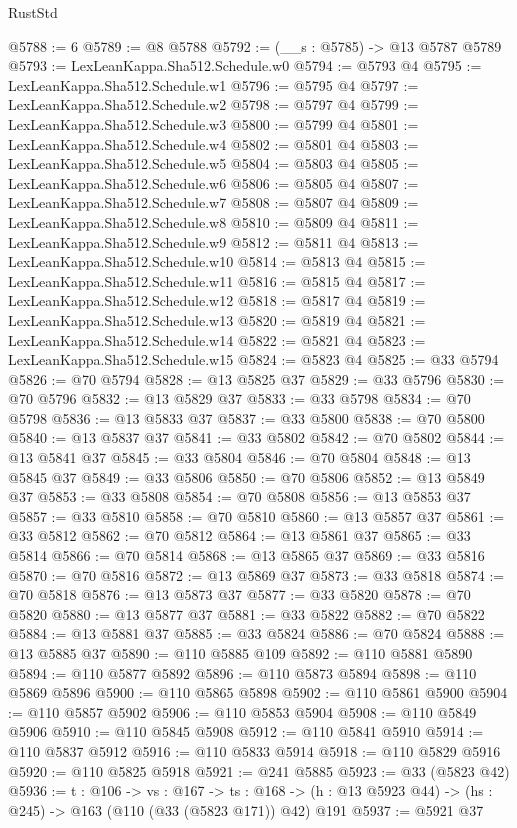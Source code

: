 \begin{lexlean}{RustStd}
\begin{coremodule}
@5788 := 6
@5789 := @8 @5788
@5792 := (__s : @5785) -> @13 @5787 @5789
@5793 := LexLeanKappa.Sha512.Schedule.w0
@5794 := @5793 @4
@5795 := LexLeanKappa.Sha512.Schedule.w1
@5796 := @5795 @4
@5797 := LexLeanKappa.Sha512.Schedule.w2
@5798 := @5797 @4
@5799 := LexLeanKappa.Sha512.Schedule.w3
@5800 := @5799 @4
@5801 := LexLeanKappa.Sha512.Schedule.w4
@5802 := @5801 @4
@5803 := LexLeanKappa.Sha512.Schedule.w5
@5804 := @5803 @4
@5805 := LexLeanKappa.Sha512.Schedule.w6
@5806 := @5805 @4
@5807 := LexLeanKappa.Sha512.Schedule.w7
@5808 := @5807 @4
@5809 := LexLeanKappa.Sha512.Schedule.w8
@5810 := @5809 @4
@5811 := LexLeanKappa.Sha512.Schedule.w9
@5812 := @5811 @4
@5813 := LexLeanKappa.Sha512.Schedule.w10
@5814 := @5813 @4
@5815 := LexLeanKappa.Sha512.Schedule.w11
@5816 := @5815 @4
@5817 := LexLeanKappa.Sha512.Schedule.w12
@5818 := @5817 @4
@5819 := LexLeanKappa.Sha512.Schedule.w13
@5820 := @5819 @4
@5821 := LexLeanKappa.Sha512.Schedule.w14
@5822 := @5821 @4
@5823 := LexLeanKappa.Sha512.Schedule.w15
@5824 := @5823 @4
@5825 := @33 @5794
@5826 := @70 @5794
@5828 := @13 @5825 @37
@5829 := @33 @5796
@5830 := @70 @5796
@5832 := @13 @5829 @37
@5833 := @33 @5798
@5834 := @70 @5798
@5836 := @13 @5833 @37
@5837 := @33 @5800
@5838 := @70 @5800
@5840 := @13 @5837 @37
@5841 := @33 @5802
@5842 := @70 @5802
@5844 := @13 @5841 @37
@5845 := @33 @5804
@5846 := @70 @5804
@5848 := @13 @5845 @37
@5849 := @33 @5806
@5850 := @70 @5806
@5852 := @13 @5849 @37
@5853 := @33 @5808
@5854 := @70 @5808
@5856 := @13 @5853 @37
@5857 := @33 @5810
@5858 := @70 @5810
@5860 := @13 @5857 @37
@5861 := @33 @5812
@5862 := @70 @5812
@5864 := @13 @5861 @37
@5865 := @33 @5814
@5866 := @70 @5814
@5868 := @13 @5865 @37
@5869 := @33 @5816
@5870 := @70 @5816
@5872 := @13 @5869 @37
@5873 := @33 @5818
@5874 := @70 @5818
@5876 := @13 @5873 @37
@5877 := @33 @5820
@5878 := @70 @5820
@5880 := @13 @5877 @37
@5881 := @33 @5822
@5882 := @70 @5822
@5884 := @13 @5881 @37
@5885 := @33 @5824
@5886 := @70 @5824
@5888 := @13 @5885 @37
@5890 := @110 @5885 @109
@5892 := @110 @5881 @5890
@5894 := @110 @5877 @5892
@5896 := @110 @5873 @5894
@5898 := @110 @5869 @5896
@5900 := @110 @5865 @5898
@5902 := @110 @5861 @5900
@5904 := @110 @5857 @5902
@5906 := @110 @5853 @5904
@5908 := @110 @5849 @5906
@5910 := @110 @5845 @5908
@5912 := @110 @5841 @5910
@5914 := @110 @5837 @5912
@5916 := @110 @5833 @5914
@5918 := @110 @5829 @5916
@5920 := @110 @5825 @5918
@5921 := @241 @5885
@5923 := @33 (@5823 @42)
@5936 := {t : @106} ->
  {vs : @167} ->
  {ts : @168} -> (h : @13 @5923 @44) -> (hs : @245) -> @163 (@110 (@33 (@5823 @171)) @42) @191
@5937 := @5921 @37

\end{coremodule}
\end{lexlean}
